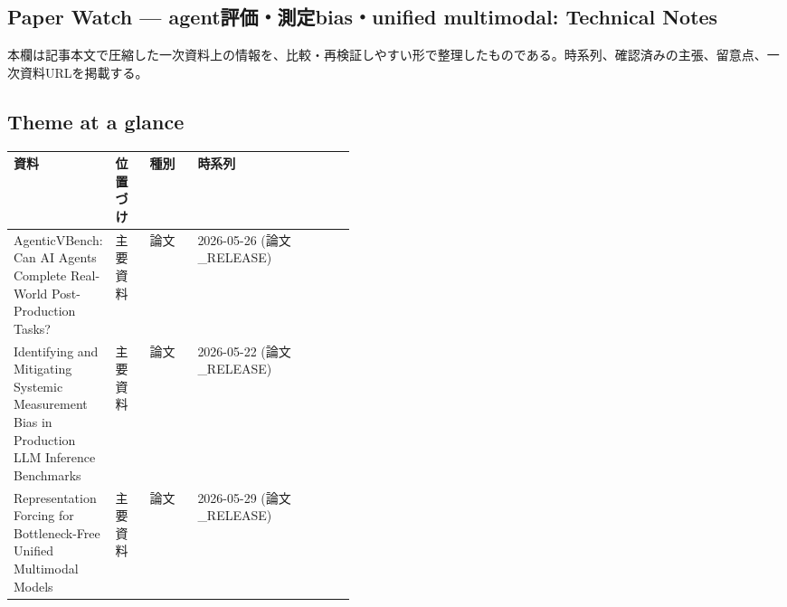 \subsection*{Paper Watch — agent評価・測定bias・unified multimodal: Technical Notes}
本欄は記事本文で圧縮した一次資料上の情報を、比較・再検証しやすい形で整理したものである。時系列、確認済みの主張、留意点、一次資料URLを掲載する。
\medskip
\subsection*{Theme at a glance}
\begin{center}
\footnotesize
\begin{tabularx}{\linewidth}{@{}p{0.20\linewidth}p{0.10\linewidth}p{0.14\linewidth}X@{}}
\toprule
資料 & 位置づけ & 種別 & 時系列 \\
\midrule
AgenticVBench: Can AI Agents Complete Real-World Post-Production Tasks? & 主要資料 & 論文 & 2026-05-26 (論文\_RELEASE) \\
Identifying and Mitigating Systemic Measurement Bias in Production LLM Inference Benchmarks & 主要資料 & 論文 & 2026-05-22 (論文\_RELEASE) \\
Representation Forcing for Bottleneck-Free Unified Multimodal Models & 主要資料 & 論文 & 2026-05-29 (論文\_RELEASE) \\
\bottomrule
\end{tabularx}
\end{center}
\normalsize

